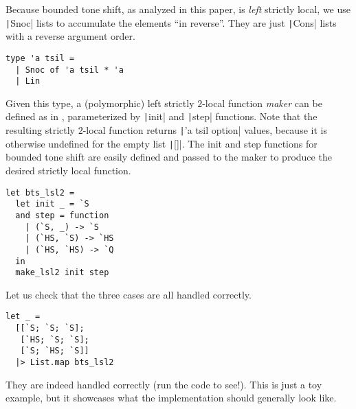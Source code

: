 \documentclass[11pt]{article}
\theoremstyle{definition}
\theoremstyle{plain}
\begin{document}
Because bounded tone shift, as analyzed in this paper, is \emph{left}
strictly local, we use \texttt|Snoc| lists to accumulate
the elements \enquote{in reverse}.  They are just
\texttt|Cons| lists with a reverse argument order.
%
\begin{verbatim}
type 'a tsil =
  | Snoc of 'a tsil * 'a
  | Lin
\end{verbatim}
%
Given this type, a (polymorphic) left strictly \(2\)-local function
\emph{maker} can be defined as in , parameterized
by \texttt|init| and \texttt|step| functions.
Note that the resulting strictly \(2\)-local function returns
\texttt|'a tsil option| values, because it is otherwise
undefined for the empty list \texttt|[]|.  The init and
step functions for bounded tone shift are easily defined and passed to
the maker to produce the desired strictly local function.
%
\begin{verbatim}
let bts_lsl2 =
  let init _ = `S
  and step = function
    | (`S, _) -> `S
    | (`HS, `S) -> `HS
    | (`HS, `HS) -> `Q
  in
  make_lsl2 init step
\end{verbatim}
%
Let us check that the three cases are all handled correctly.
%
\begin{verbatim}
let _ =
  [[`S; `S; `S];
   [`HS; `S; `S];
   [`S; `HS; `S]]
  |> List.map bts_lsl2
\end{verbatim}
%
They are indeed handled correctly (run the code to see!).  This is
just a toy example, but it showcases what the implementation should
generally look like.
\end{document}

